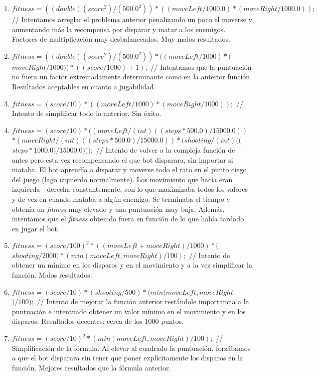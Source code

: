 \begin{enumerate}
\begin{enumerate}
        \item $fitness = ((double)(score^{2}) / (500.0^{2})) * ((moveLeft / 1000.0) * (moveRight / 1000.0));$ // Intentamos arreglar el problema anterior penalizando un poco el moverse y aumentando más la recompensa por disparar y matar a los enemigos. Factores de multiplicación muy desbalanceados. Muy malos resultados.
        \item $fitness = ((double)(score^{2}) / (500.0^{2})) * ((moveLeft / 1000) * ($ $moveRight / 1000)) * ((score / 1000) + 1);$ // Intentamos que la puntuación no fuera un factor extremadamente determinante como en la anterior función. Resultados aceptables en cuanto a jugabilidad.
        \item $fitness = (score / 10) * ((moveLeft / 1000) * (moveRight / 1000));$ // Intento de simplificar todo lo anterior. Sin éxito.
        \item $fitness = (score / 10) * ((moveLeft / (int)((steps * 500.0) / 15000.0))$ $* (moveRight / (int)((steps * 500.0) / 15000.0)) * (shooting / (int)(($ $steps * 1000.0) / 15000.0)));$ // Intento de volver a la compleja función de antes pero esta vez recompensando el que bot disparara, sin importar si mataba. El bot aprendía a disparar y moverse todo el rato en el punto ciego del juego (lago izquierdo normalmente). Los movimiento que hacía eran izquierda - derecha constantemente, con lo que maximizaba todos los valores y de vez en cuando mataba a algún enemigo. Se terminaba el tiempo y obtenía un \textit{fitness} muy elevado y una puntuación muy baja. Además, intentamos que el \textit{fitness} obtenido fuera en función de lo que había tardado en jugar el bot.
        \item $fitness = (score / 100)^{2} * ((moveLeft + moveRight) / 1000) * ($ $shooting / 2000) * (min(moveLeft, moveRight) / 100);$ // Intento de obtener un mínimo en los disparos y en el movimiento y a la vez simplificar la función. Malos resultados.
        \item $fitness = (score / 10) * (shooting / 500) * (min(moveLeft, moveRight$ $) / 100);$ // Intento de mejorar la función anterior restándole importancia a la puntuación e intentnado obtener un valor mínimo en el movimiento y en los disparos. Resultados decentes: cerca de los 1000 puntos.
        \item $fitness = (score / 10)^{2} * (min(moveLeft, moveRight) / 100);$ // Simplificación de la fórmula. Al elevar al cuadrado la puntuación, forzábamos a que el bot disparara sin tener que poner explícitamente los disparos en la función. Mejores resultados que la fórmula anterior.

\end{enumerate}
\end{enumerate}
